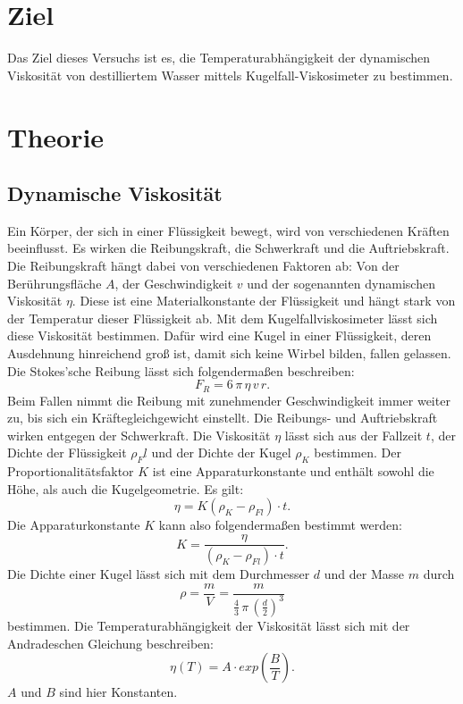 \section{Ziel}
Das Ziel dieses Versuchs ist es, die Temperaturabhängigkeit
der dynamischen Viskosität von destilliertem Wasser mittels
Kugelfall-Viskosimeter zu bestimmen.

\section{Theorie}
\label{sec:Theorie}

\subsection{Dynamische Viskosität}
Ein Körper, der sich in einer Flüssigkeit bewegt, wird von verschiedenen Kräften beeinflusst. 
Es wirken die Reibungskraft, die Schwerkraft und die Auftriebskraft. 
Die Reibungskraft hängt dabei von verschiedenen Faktoren ab:
Von der Berührungsfläche $A$, der Geschwindigkeit $v$ und
der sogenannten dynamischen Viskosität $\eta$. 
Diese ist eine Materialkonstante der Flüssigkeit und hängt stark von der Temperatur dieser Flüssigkeit ab. 
\newline
Mit dem Kugelfallviskosimeter lässt sich diese Viskosität bestimmen. 
Dafür wird eine Kugel in einer Flüssigkeit, deren Ausdehnung hinreichend groß ist, 
damit sich keine Wirbel bilden, fallen gelassen. 
Die Stokes'sche Reibung lässt sich folgendermaßen beschreiben:
\begin{equation*}
    F_R = 6 \, \pi \, \eta \, v \, r.
\end{equation*}
Beim Fallen nimmt die Reibung mit zunehmender Geschwindigkeit immer weiter zu, 
bis sich ein Kräftegleichgewicht einstellt. 
Die Reibungs- und Auftriebskraft wirken entgegen der Schwerkraft. 
Die Viskosität $\eta$ lässt sich aus der Fallzeit $t$, 
der Dichte der Flüssigkeit $\rho_Fl$ und der Dichte der Kugel $\rho_K$ bestimmen.
Der Proportionalitätsfaktor $K$ ist eine Apparaturkonstante und enthält sowohl die Höhe,
als auch die Kugelgeometrie.
Es gilt:
\begin{equation}
    \eta = K (\rho_K -\rho_{Fl}) \cdot t.
    \label{eqn:eta}
\end{equation}
Die Apparaturkonstante $K$ kann also folgendermaßen bestimmt werden:
\begin{equation}
    K = \frac{\eta}{(\rho_{K}-\rho_{Fl}) \cdot t}.
    \label{eqn:K}
\end{equation}
Die Dichte einer Kugel lässt sich mit dem Durchmesser $d$ und der Masse $m$ durch 
\begin{equation}
    \rho = \frac{m}{V} = \frac{m}{\frac{4}{3} \, \pi \, \left( \frac{d}{2} \right)^3}
    \label{eqn:dichte}
\end{equation}
bestimmen.
Die Temperaturabhängigkeit der Viskosität lässt sich mit der Andradeschen Gleichung 
beschreiben: 
\begin{equation}
    \eta(T) = A\cdot exp \left( \frac{B}{T} \right). %
    \label{eqn:temp}
\end{equation}
$A$ und $B$ sind hier Konstanten.

